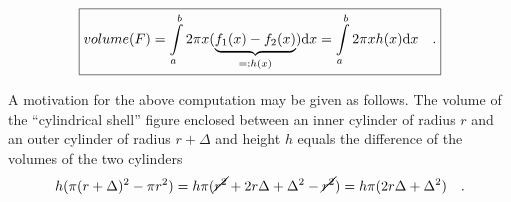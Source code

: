 \documentclass[12pt]{book}
\renewcommand{\optionalDisplay}[1]{}
\begin{document}
\begin{equation}\boxed{\label{eqVolumeRotationalSolid}
volume(F) = \int\limits_{a}^b 2\pi x (\underbrace{f_1(x)-f_2(x)}_{=: h(x)}) {\normalfont \text{d}} x=  \int\limits_{a}^b 2\pi x h(x) {\normalfont \text{d}} x\quad .
}
\end{equation}

A motivation for the above computation may be given as follows. The volume of the ``cylindrical shell'' figure enclosed between an inner cylinder of radius $r$ and an outer cylinder of radius $r+\Delta$ and height $h$ equals the difference of the volumes of the two cylinders
\[
h(\pi (r+\Delta)^2-\pi r^2)=h\pi (\cancel{r^2}+2r\Delta+\Delta^2- \cancel{ r^2}) = h\pi (2r\Delta+\Delta^2)\quad .
\]

\optionalDisplay{
\psset{xunit=2cm,yunit=2cm}
\psset{lightsrc=50 20 20,viewpoint=100 45 30 rtp2xyz,Decran=110,linewidth=0.2pt}

\begin{pspicture*}(-1,-1)(1,1)
\defFunction[algebraic]{innerC}(t)
{cos(t)}{sin(t)}{}
\defFunction[algebraic]{outerC}(t)
{1.1*cos(t)}{1.1*sin(t)}{}
\psSolid[object=prisme,h=0.6,
fillcolor=red,
resolution=30,
base=0 6.3 {outerC} CourbeR2+
6.3  0 {innerC} CourbeR2+](0,0,-0.6)
\psline[linecolor=black, linewidth=0.3pt, arrows={|-|}] (0,0.4) (0.55,0.4)
\psline[linecolor=black, linewidth=0.3pt, arrows={|-|}] (0,0.7) (0.607,0.7)
\rput(0.25, 0.52 ){\tiny $r$}
\rput(0.30, 0.82 ){\tiny $r+\Delta$}
\psline[linecolor=black, linewidth=0.3pt, arrows={|-|}] (0.7,0) (0.7,-0.3)
\rput[l](0.75, -0.15 ){\tiny $h$}
\end{pspicture*}
}
\end{document}
